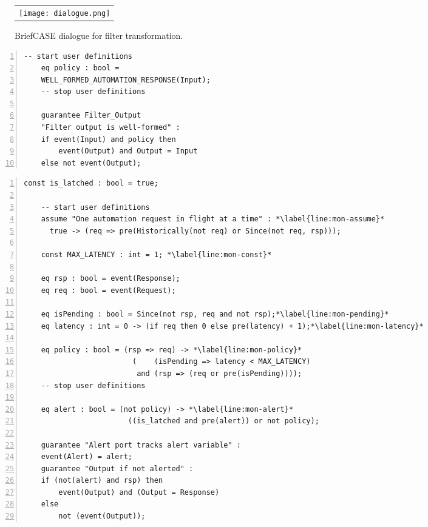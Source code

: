 \begin{figure}
  \begin{center}
    \begin{tabular}{c}
    \texttt{[image: dialogue.png]}
    \end{tabular}
  \end{center}
  \caption{BriefCASE dialogue for filter transformation.}
  \label{fig:dialogue}
\end{figure}

\newsavebox{\flt}
\begin{lrbox}{\flt}
  \begin{lstlisting}[style=agree,numbers=left]
    -- start user definitions
    eq policy : bool = 
    WELL_FORMED_AUTOMATION_RESPONSE(Input);
    -- stop user definitions

    guarantee Filter_Output
    "Filter output is well-formed" :
    if event(Input) and policy then 
        event(Output) and Output = Input
    else not event(Output);
  \end{lstlisting}
\end{lrbox}

\newsavebox{\mntr}
\begin{lrbox}{\mntr}
  \begin{lstlisting}[style=agree,numbers=left]
    const is_latched : bool = true;

    -- start user definitions
    assume "One automation request in flight at a time" : *\label{line:mon-assume}*
      true -> (req => pre(Historically(not req) or Since(not req, rsp)));

    const MAX_LATENCY : int = 1; *\label{line:mon-const}*
        
    eq rsp : bool = event(Response);
    eq req : bool = event(Request);

    eq isPending : bool = Since(not rsp, req and not rsp);*\label{line:mon-pending}*
    eq latency : int = 0 -> (if req then 0 else pre(latency) + 1);*\label{line:mon-latency}*
    
    eq policy : bool = (rsp => req) -> *\label{line:mon-policy}*
                         (    (isPending => latency < MAX_LATENCY)   
                          and (rsp => (req or pre(isPending))));
    -- stop user definitions
    
    eq alert : bool = (not policy) -> *\label{line:mon-alert}*
                        ((is_latched and pre(alert)) or not policy);
                          
    guarantee "Alert port tracks alert variable" :
    event(Alert) = alert;
    guarantee "Output if not alerted" :
    if (not(alert) and rsp) then
        event(Output) and (Output = Response)
    else
        not (event(Output));    
  \end{lstlisting}
\end{lrbox}

